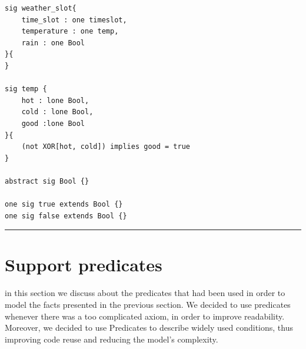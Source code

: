 \begin{verbatim}
sig weather_slot{
    time_slot : one timeslot,
    temperature : one temp,
	rain : one Bool
}{
}
    
sig temp {
    hot : lone Bool,
    cold : lone Bool,
    good :lone Bool
}{
    (not XOR[hot, cold]) implies good = true
}

abstract sig Bool {}

one sig true extends Bool {}
one sig false extends Bool {}

\end{verbatim}
\rule{\textwidth}{0.4pt}


\section{Support predicates}

in this section we discuss about the predicates that had been used in order to model the facts presented in the previous section. We decided to use predicates whenever there was a too complicated axiom, in order to improve readability. Moreover, we decided to use Predicates to describe widely used conditions, thus improving code reuse and reducing the model's complexity.

